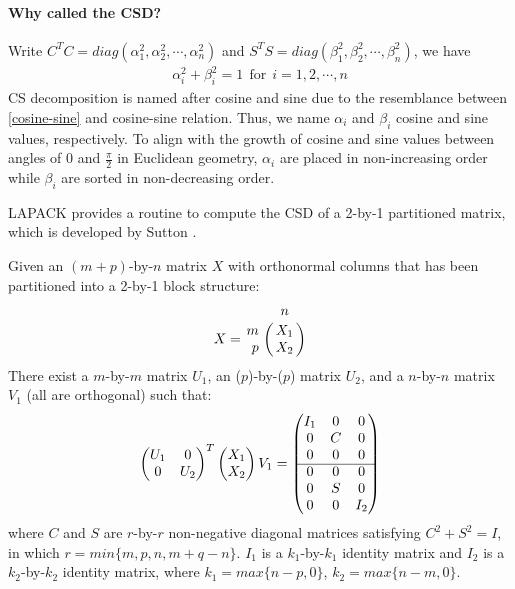 \paragraph{Why called the CSD?}
Write $C^{T}C = diag(\alpha_1^{2}, \alpha_2^{2}, \cdots, \alpha_n^{2})$ 
and $S^{T}S = diag(\beta_1^{2}, \beta_2^{2}, \cdots, \beta_n^{2})$, 
we have 
\begin{align} \label{cosine-sine}
\alpha_i^{2} + \beta_i^{2} = 1 \ \  \text{for} \ \ i = 1,2,\cdots,n
\end{align}
CS decomposition is named after cosine and sine due to the 
resemblance between \eqref{cosine-sine} and cosine-sine relation. Thus, we name $\alpha_i$ and $\beta_i$ cosine and sine values, respectively. To align with the growth of cosine and sine values between angles of 0 and $\frac{\pi}{2}$ in Euclidean geometry, $\alpha_i$ are placed in non-increasing order while $\beta_i$ are sorted in non-decreasing order. 

\begin{remark}
{\rm  
LAPACK provides a routine to compute the CSD of 
a 2-by-1 partitioned matrix, which is developed 
by Sutton \cite{sutton2009computing}.  
    
Given an $(m+p)$-by-$n$ matrix $X$ with orthonormal columns that has been partitioned into a 2-by-1 block structure: 
        \begin{displaymath}
            X = \bordermatrix{ & n  \cr
            \hfill m & X_1 \cr
            \hfill p & X_2}
        \end{displaymath}
    There exist a $m$-by-$m$ matrix $U_1$, an ($p$)-by-($p$) matrix $U_2$, and a $n$-by-$n$ matrix $V_1$ (all are orthogonal) such that:
        \begin{displaymath}
            \begin{pmatrix}
                U_1 & 0 \\
                0 & U_2
            \end{pmatrix}^{T}
            \begin{pmatrix}
                X_1 \\
                X_2
            \end{pmatrix}V_1 = 
            \begin{pmatrix}
                I_1 & 0 & 0 \\
                0 & C & 0 \\
                0 & 0 & 0 \\
                \cline{1-3} 
                0 & 0 & 0 \\
                0 & S & 0 \\
                0 & 0 & I_2
            \end{pmatrix}
        \end{displaymath}
    where $C$ and $S$ are $r$-by-$r$ non-negative diagonal matrices satisfying $C^2 + S^2 = I$, in which $r = min\{m,p,n,m+q-n\}$. $I_1$ is a $k_1$-by-$k_1$ identity matrix and $I_2$ is a $k_2$-by-$k_2$ identity matrix, where $k_1 = max\{n-p,0\}$, $k_2 = max\{n-m,0\}$.
}\end{remark} 

